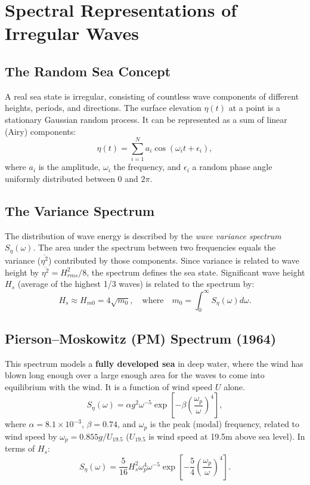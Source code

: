 \documentclass[11pt,letterpaper]{article}
\begin{document}
    \section{Spectral Representations of Irregular Waves}
    \subsection{The Random Sea Concept}
    A real sea state is irregular, consisting of countless wave components of different heights, periods, and directions. The surface elevation $\eta(t)$ at a point is a stationary Gaussian random process. It can be represented as a sum of linear (Airy) components:
    \begin{equation}
        \eta(t) = \sum_{i=1}^{N} a_i \cos(\omega_i t + \epsilon_i),
    \end{equation}
    where $a_i$ is the amplitude, $\omega_i$ the frequency, and $\epsilon_i$ a random phase angle uniformly distributed between $0$ and $2\pi$.

    \subsection{The Variance Spectrum}
    The distribution of wave energy is described by the \emph{wave variance spectrum} $S_\eta(\omega)$. The area under the spectrum between two frequencies equals the variance ($\overline{\eta^2}$) contributed by those components. Since variance is related to wave height by $\overline{\eta^2} = H_{rms}^2/8$, the spectrum defines the sea state. Significant wave height $H_s$ (average of the highest 1/3 waves) is related to the spectrum by:
    \begin{equation}
        H_s \approx H_{m0} = 4\sqrt{m_0}, \quad \text{where} \quad m_0 = \int_0^\infty S_\eta(\omega)  d\omega.
    \end{equation}

    \subsection{Pierson–Moskowitz (PM) Spectrum (1964)}
    This spectrum models a \textbf{fully developed sea} in deep water, where the wind has blown long enough over a large enough area for the waves to come into equilibrium with the wind. It is a function of wind speed $U$ alone.
    \begin{equation}
        S_\eta(\omega) = \alpha g^2 \omega^{-5} \exp\left[-\beta \left(\frac{\omega_p}{\omega}\right)^4\right],
    \end{equation}
    where $\alpha = 8.1\times10^{-3}$, $\beta=0.74$, and $\omega_p$ is the peak (modal) frequency, related to wind speed by $\omega_p = 0.855 g / U_{19.5}$ ($U_{19.5}$ is wind speed at 19.5m above sea level). In terms of $H_s$:
    \begin{equation}
        S_\eta(\omega) = \frac{5}{16} H_s^2 \omega_p^4 \omega^{-5} \exp\left[-\frac{5}{4}\left(\frac{\omega_p}{\omega}\right)^4\right].
    \end{equation}
\end{document}
